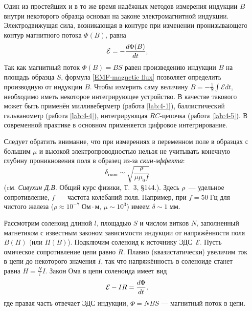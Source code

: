 Один из простейших и в то же время надёжных методов измерения
индукции $B$ внутри некоторого образца основан
на законе электромагнитной индукции.
Электродвижущая сила, возникающая в контуре при изменении
пронизывающего контур магнитного потока $\Phi(B)$, равна
\begin{equation}
	\eqmark{EMF-magnetic flux}
	\mathcal{E} = - \frac{d\Phi (B)}{dt},
\end{equation}
Так как магнитный поток $\Phi (B)=BS$ равен произведению индукции $B$ на площадь
образца $S$, формула \eqref{EMF-magnetic flux} позволяет определить производную от
индукции $B$. Чтобы измерить саму величину $B=-\frac1{S}\int \mathcal{E} dt$,
необходимо иметь некоторое интегрирующее устройство.
В качестве такового может быть применён милливеберметр 
(работа \ref{lab:4-1}),
баллистический гальванометр (работа \ref{lab:4-4}), интегрирующая $RC$-цепочка
(работа \ref{lab:4-5}). 
В современной практике в основном применяется цифровое интегрирование.

\begin{lab:note}
Следует обратить внимание, что при измерениях в переменном поле
в образцах с большим $\mu$ и высокой электропроводностью
нельзя не учитывать конечную глубину
проникновения поля в образец из-за \emph{скин-эффекта}:
\begin{equation*}
\delta_{скин} \sim \sqrt{\frac{\rho}{\mu \mu_0 f}}
\end{equation*}
(cм. \textit{Сивухин Д.В.} Общий курс физики, Т.~3, \S 144.).
Здесь $\rho$~--- удельное сопротивление, $f$~--- частота колебаний поля.
Например, при $f=50\;Гц$ для чистого железа ($\rho \approx 10^{-7}\;Ом\cdot м$,
$\mu \sim 10^3$) имеем $\delta \sim 1\;мм$.
\end{lab:note}

\label{sec:forces}


Рассмотрим соленоид длиной $l$, площадью $S$ и числом витков $N$,
заполненный магнетиком с известным законом зависимости индукции от напряжённости
поля $B(H)$ (или $H(B)$). Подключим соленоид к источнику ЭДС~$\mathcal{E}$.
Пусть омическое сопротивление цепи равно $R$.
Плавно (квазистатически) увеличим ток в цепи до некоторого значения
$I$, так что напряжённость в соленоиде станет равна
$H = \frac{N}{l} I$. Закон Ома в цепи соленоида имеет вид
\begin{equation}
    \eqmark{OhmLaw-solenoid}
\mathcal{E} - IR = \frac{d\Phi}{dt},
\end{equation}
где правая часть отвечает ЭДС индукции, $\Phi = NBS$ --- магнитный поток в
цепи.

